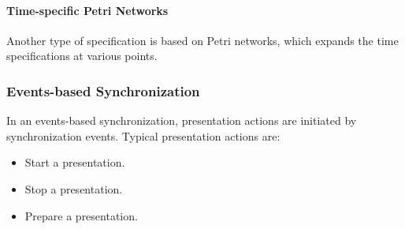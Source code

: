 \paragraph*{Time-specific Petri Networks}
Another type of specification is based on Petri networks, which expands the time specifications at various points.

\subsubsection{Events-based Synchronization}
In an events-based synchronization, presentation actions are initiated by synchronization events. Typical presentation actions are:
\begin{itemize}
\item Start a presentation. 
\item Stop a presentation. 
\item Prepare a presentation.
\end{itemize}


\newpage\thispagestyle{empty}
